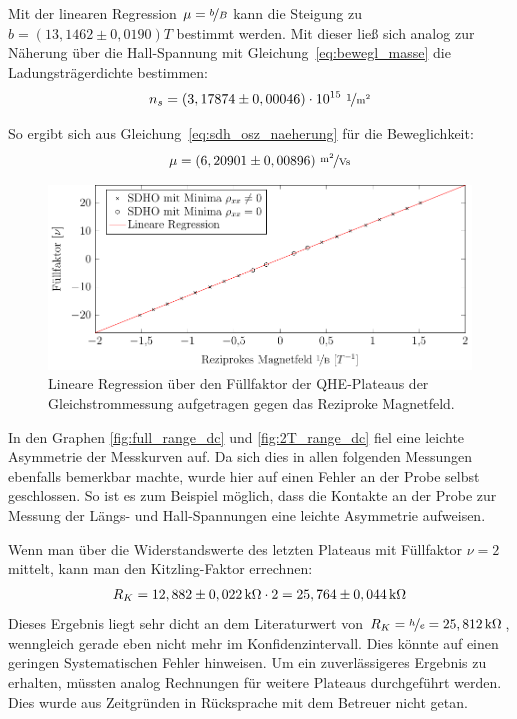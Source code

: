Mit der linearen Regression $\mu = \nicefrac{b}{B}$ kann die Steigung zu $b=(13,1462 \pm 0,0190)\unit{T}$ bestimmt werden. Mit dieser ließ sich analog zur Näherung über die Hall-Spannung mit Gleichung~\eqref{eq:bewegl_masse} die Ladungsträgerdichte bestimmen:
\begin{equation}
n_s=  ( 3,17874 \pm 0,00046) \cdot 10^{15} ~ \unitfrac{1}{m^2}\\ %
\end{equation}

So ergibt sich aus Gleichung~\eqref{eq:sdh_osz_naeherung} für die Beweglichkeit:
\begin{equation}
\mu= (6,20901\pm 0,00896) ~ \unitfrac{m^2}{Vs} %
\end{equation}
 

\begin{figure}[h]
	\centering
	\includegraphics{graphs/dc/auswertung.pdf}
	\caption[Lineare Regression Gleichstrommessung]{
		Lineare Regression über den Füllfaktor der QHE-Plateaus der Gleichstrommessung aufgetragen gegen das Reziproke Magnetfeld.
	}
	\label{fig:dc_sdho_ausw}
\end{figure}

In den Graphen \ref{fig:full_range_dc} und \ref{fig:2T_range_dc} fiel eine leichte Asymmetrie der Messkurven auf. Da sich dies in allen folgenden Messungen ebenfalls bemerkbar machte, wurde hier auf einen Fehler an der Probe selbst geschlossen. So ist es zum Beispiel möglich, dass die Kontakte an der Probe zur Messung der Längs- und Hall-Spannungen eine leichte Asymmetrie aufweisen.

Wenn man über die Widerstandswerte des letzten Plateaus mit Füllfaktor $\nu = 2$ mittelt, kann man den Kitzling-Faktor errechnen:
$$ R_K = \unit[12,882 \pm 0,022]{k \Omega} \cdot 2 = \unit[25,764 \pm 0,044]{k \Omega}$$
Dieses Ergebnis liegt sehr dicht an dem Literaturwert von $R_K=\nicefrac{h}{e}=\unit[25,812]{k \Omega}$, wenngleich gerade eben nicht mehr im Konfidenzintervall. Dies könnte auf einen geringen Systematischen Fehler hinweisen. Um ein zuverlässigeres Ergebnis zu erhalten, müssten analog Rechnungen für weitere Plateaus durchgeführt werden. Dies wurde aus Zeitgründen in Rücksprache mit dem Betreuer nicht getan.